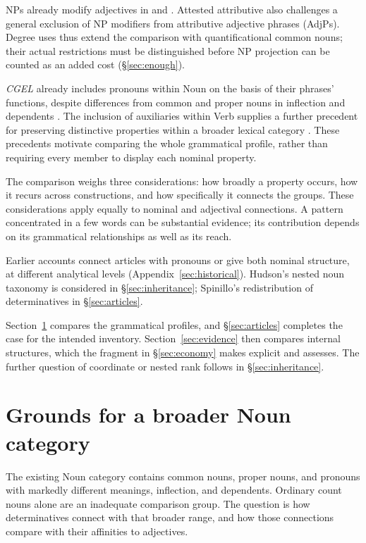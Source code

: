 \documentclass[12pt]{article}
\begin{document}
NPs already modify adjectives in  and  \citep[549--550]{huddleston2002}. Attested attributive  also challenges a general exclusion of NP modifiers from attributive adjective phrases (AdjPs). Degree uses thus extend the comparison with quantificational common nouns; their actual restrictions must be distinguished before NP projection can be counted as an added cost (§\ref{sec:enough}).

\textit{CGEL} already includes pronouns within Noun on the basis of their phrases' functions, despite differences from common and proper nouns in inflection and dependents \citep[327--328]{huddleston2002}. The inclusion of auxiliaries within Verb supplies a further precedent for preserving distinctive properties within a broader lexical category \citep{pullumwilson1977}. These precedents motivate comparing the whole grammatical profile, rather than requiring every member to display each nominal property.

The comparison weighs three considerations: how broadly a property occurs, how it recurs across constructions, and how specifically it connects the groups. These considerations apply equally to nominal and adjectival connections. A pattern concentrated in a few words can be substantial evidence; its contribution depends on its grammatical relationships as well as its reach.

Earlier accounts connect articles with pronouns or give both nominal structure, at different analytical levels (Appendix~\ref{sec:historical}). Hudson's nested noun taxonomy is considered in §\ref{sec:inheritance}; Spinillo's redistribution of determinatives in §\ref{sec:articles}.

Section~\ref{sec:proposal} compares the grammatical profiles, and §\ref{sec:articles} completes the case for the intended inventory. Section~\ref{sec:evidence} then compares internal structures, which the fragment in §\ref{sec:economy} makes explicit and assesses. The further question of coordinate or nested rank follows in §\ref{sec:inheritance}.

\section{Grounds for a broader Noun category}\label{sec:proposal}

The existing Noun category contains common nouns, proper nouns, and pronouns with markedly different meanings, inflection, and dependents. Ordinary count nouns alone are an inadequate comparison group. The question is how determinatives connect with that broader range, and how those connections compare with their affinities to adjectives.
\end{document}
